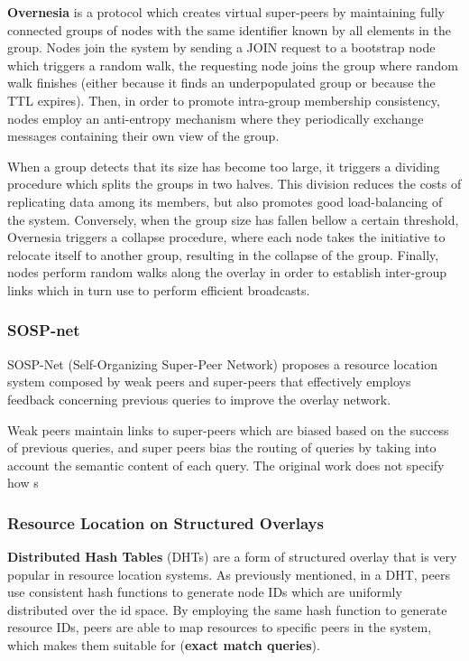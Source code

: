 \textbf{Overnesia} \cite{leitao2014overnesia} is a protocol which creates virtual super-peers by maintaining fully connected groups of nodes with the same identifier known by all elements in the group. Nodes join the system by sending a JOIN request to a bootstrap node which triggers a random walk, the requesting node joins the group where random walk finishes (either because it finds an underpopulated group or because the TTL expires). Then, in order to promote intra-group membership consistency, nodes employ an anti-entropy mechanism where they periodically exchange messages containing their own view of the group. 

When a group detects that its size has become too large, it triggers a dividing procedure which splits the groups in two halves. This division reduces the costs of replicating data among its members, but also promotes good load-balancing of the system. Conversely, when the group size has fallen bellow a certain threshold, Overnesia triggers a collapse procedure, where each node takes the initiative to relocate itself to another group, resulting in the collapse of the group. Finally, nodes perform random walks along the overlay in order to establish inter-group links which in turn use to perform efficient broadcasts.

\subsubsection*{SOSP-net}

SOSP-Net \cite{garbacki2007optimizing}  (Self-Organizing Super-Peer Network) proposes a resource location system composed by weak peers and super-peers that effectively employs feedback concerning previous queries to improve the overlay network. 

Weak peers maintain links to super-peers which are biased based on the success of previous queries, and super peers bias the routing of queries by taking into account the semantic content of each query. The original work does not specify how s

\subsubsection{Resource Location on Structured Overlays}

\textbf{Distributed Hash Tables} (DHTs) are a form of structured overlay that is very popular in resource location systems. As previously mentioned, in a DHT, peers use consistent hash functions to generate node IDs which are uniformly distributed over the id space. By employing the same hash function to generate resource IDs, peers are able to map resources to specific peers in the system, which makes them suitable for (\textbf{exact match queries}).


